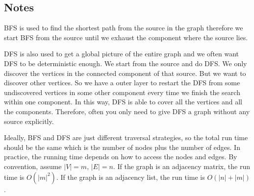 \documentclass[en,hazy,blue,normal,12pt]{elegantnote}
\begin{document}
\subsection{Notes}
BFS is used to find the shortest path from the source in the graph therefore we 
start BFS from the source until we exhaust the component where the source lies.

DFS is also used to get a global picture of the entire graph and we often want 
DFS to be deterministic enough. We start from the source and do DFS. We only 
discover the vertices in the connected component of that source. But we want to 
discover other vertices. So we have a outer layer to restart the DFS from some 
undiscovered vertices in some other component every time we finish the search 
within one component. In this way, DFS is able to cover all the vertices and 
all the components. Therefore, often you only need to give DFS a graph without 
any source explicitly.

Ideally, BFS and DFS are just different traversal strategies, so the total run time should be the same which is the number of nodes plus the number of edges. In practice, the running time depends on how to access the nodes and edges. By convention, assume $|V| = m$, $|E| = n$. If the graph is an adjacency matrix, the run time is $O(|m|^2)$. If the graph is an adjacency list, the run time is $O(|n| + |m|)$.
\end{document}
